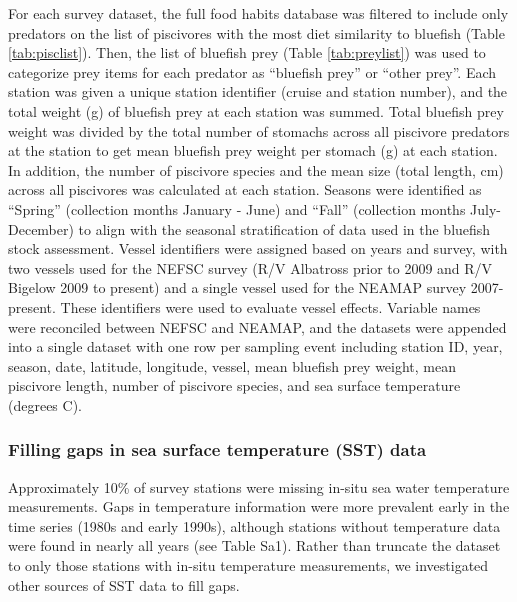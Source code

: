 \documentclass[
]{article}
\begin{document}
For each survey dataset, the full food habits database was filtered to include only predators on the list of piscivores with the most diet similarity to bluefish (Table \ref{tab:pisclist}). Then, the list of bluefish prey (Table \ref{tab:preylist}) was used to categorize prey items for each predator as ``bluefish prey'' or ``other prey''. Each station was given a unique station identifier (cruise and station number), and the total weight (g) of bluefish prey at each station was summed. Total bluefish prey weight was divided by the total number of stomachs across all piscivore predators at the station to get mean bluefish prey weight per stomach (g) at each station. In addition, the number of piscivore species and the mean size (total length, cm) across all piscivores was calculated at each station. Seasons were identified as ``Spring'' (collection months January - June) and ``Fall'' (collection months July-December) to align with the seasonal stratification of data used in the bluefish stock assessment. Vessel identifiers were assigned based on years and survey, with two vessels used for the NEFSC survey (R/V Albatross prior to 2009 and R/V Bigelow 2009 to present) and a single vessel used for the NEAMAP survey 2007-present. These identifiers were used to evaluate vessel effects. Variable names were reconciled between NEFSC and NEAMAP, and the datasets were appended into a single dataset with one row per sampling event including station ID, year, season, date, latitude, longitude, vessel, mean bluefish prey weight, mean piscivore length, number of piscivore species, and sea surface temperature (degrees C).

\hypertarget{filling-gaps-in-sea-surface-temperature-sst-data}{%
\subsubsection{Filling gaps in sea surface temperature (SST) data}\label{filling-gaps-in-sea-surface-temperature-sst-data}}

Approximately 10\% of survey stations were missing in-situ sea water temperature measurements. Gaps in temperature information were more prevalent early in the time series (1980s and early 1990s), although stations without temperature data were found in nearly all years (see Table Sa1). Rather than truncate the dataset to only those stations with in-situ temperature measurements, we investigated other sources of SST data to fill gaps.
\end{document}
